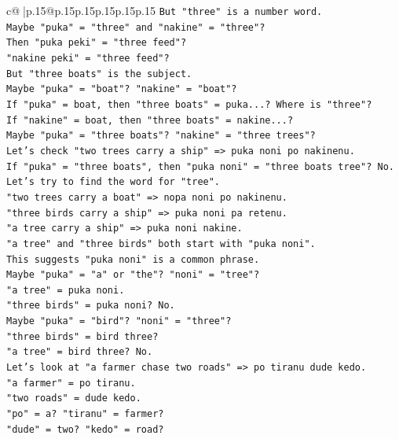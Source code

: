 \documentclass{article}
\begin{document}
{\begin{supertabular}{c@{$\;$}|p{.15\linewidth}@{}p{.15\linewidth}p{.15\linewidth}p{.15\linewidth}p{.15\linewidth}p{.15\linewidth}}
{{{\texttt{But "three" is a number word.} \\
\texttt{Maybe "puka" = "three" and "nakine" = "three"?} \\
\texttt{Then "puka peki" = "three feed"?} \\
\texttt{"nakine peki" = "three feed"?} \\
\texttt{But "three boats" is the subject.} \\
\texttt{Maybe "puka" = "boat"? "nakine" = "boat"?} \\
\texttt{If "puka" = boat, then "three boats" = puka...? Where is "three"?} \\
\texttt{If "nakine" = boat, then "three boats" = nakine...?} \\
\texttt{Maybe "puka" = "three boats"? "nakine" = "three trees"?} \\
\texttt{Let's check "two trees carry a ship" => puka noni po nakinenu.} \\
\texttt{If "puka" = "three boats", then "puka noni" = "three boats tree"? No.} \\
\texttt{Let's try to find the word for "tree".} \\
\texttt{"two trees carry a boat" => nopa noni po nakinenu.} \\
\texttt{"three birds carry a ship" => puka noni pa retenu.} \\
\texttt{"a tree carry a ship" => puka noni nakine.} \\
\texttt{"a tree" and "three birds" both start with "puka noni".} \\
\texttt{This suggests "puka noni" is a common phrase.} \\
\texttt{Maybe "puka" = "a" or "the"? "noni" = "tree"?} \\
\texttt{"a tree" = puka noni.} \\
\texttt{"three birds" = puka noni? No.} \\
\texttt{Maybe "puka" = "bird"? "noni" = "three"?} \\
\texttt{"three birds" = bird three?} \\
\texttt{"a tree" = bird three? No.} \\
\texttt{Let's look at "a farmer chase two roads" => po tiranu dude kedo.} \\
\texttt{"a farmer" = po tiranu.} \\
\texttt{"two roads" = dude kedo.} \\
\texttt{"po" = a? "tiranu" = farmer?} \\
\texttt{"dude" = two? "kedo" = road?} \\
}}}
\end{supertabular}}
\end{document}
